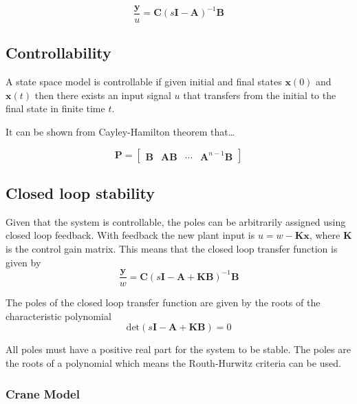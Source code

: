 \documentclass{article}
\begin{document}
\begin{equation} 
  \frac{\mathbf{y}}{u} = \mathbf{C} (s\mathbf{I} - \mathbf{A}) ^{-1} \mathbf{B}
\end{equation}

\subsection{Controllability}


A state space model is controllable if given initial and final states $\mathbf{x}(0)$ and $\mathbf{x}(t)$
then there exists an input signal $u$ that transfers from the initial to the final state in finite time $t$.

It can be shown from Cayley-Hamilton theorem that\dots 

\begin{equation}
  \mathbf{P} = \begin{bmatrix}
    \mathbf{B} & \mathbf{AB} & \cdots & \mathbf{A}^{n-1}\mathbf{B}
  \end{bmatrix}
\end{equation}

\subsection{Closed loop stability}
Given that the system is controllable, the poles can be arbitrarily assigned using closed loop feedback.
With feedback the new plant input is $u = w - \mathbf{Kx}$, where $\mathbf{K}$ is the control gain matrix.
This means that the closed loop transfer function is given by
\begin{equation}
  \frac{\mathbf{y}}{w} = \mathbf{C} (s\mathbf{I} - \mathbf{A} + \mathbf{KB}) ^{-1} \mathbf{B}
\end{equation}

The poles of the closed loop transfer function are given by the roots of the characteristic polynomial
\begin{equation}
  \text{det} \left( s\mathbf{I} - \mathbf{A} + \mathbf{KB} \right) = 0
  \label{eq:det_poly}
\end{equation}

All poles must have a positive real part for the system to be stable.
The poles are the roots of a polynomial which means the Routh-Hurwitz criteria can be used.

\subsubsection{Crane Model}
\end{document}
